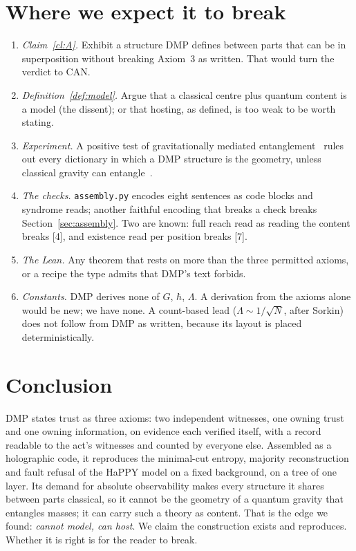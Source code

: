 \documentclass[11pt,a4paper]{article}
\theoremstyle{definition}
\theoremstyle{remark}
\newcommand{\chk}[1]{\textsf{[#1]}}
\begin{document}
\section{Where we expect it to break}\label{sec:break}
\begin{enumerate}[nosep]
\item \emph{Claim~\ref{cl:A}.} Exhibit a structure DMP defines between parts that can be in superposition without breaking Axiom~3 as
written. That would turn the verdict to CAN.
\item \emph{Definition~\ref{def:model}.} Argue that a classical centre plus quantum content is a model (the dissent); or that hosting, as
defined, is too weak to be worth stating.
\item \emph{Experiment.} A positive test of gravitationally mediated entanglement~\cite{bose,mv} rules out every dictionary in which a DMP
structure is the geometry, unless classical gravity can entangle~\cite{azizhowl}.
\item \emph{The checks.} \texttt{assembly.py} encodes eight sentences as code blocks and syndrome reads; another faithful encoding that
breaks a check breaks Section~\ref{sec:assembly}. Two are known: full reach read as reading the content breaks \chk{4}, and existence read
per position breaks \chk{7}.
\item \emph{The Lean.} Any theorem that rests on more than the three permitted axioms, or a recipe the type admits that DMP's text forbids.
\item \emph{Constants.} DMP derives none of $G$, $\hbar$, $\Lambda$. A derivation from the axioms alone would be new; we have none. A
count-based lead ($\Lambda\sim 1/\sqrt N$, after Sorkin) does not follow from DMP as written, because its layout is placed
deterministically.
\end{enumerate}

\section{Conclusion}

DMP states trust as three axioms: two independent witnesses, one owning trust and one owning information, on evidence each verified
itself, with a record readable to the act's witnesses and counted by everyone else. Assembled as a holographic code, it reproduces the
minimal-cut entropy, majority reconstruction and fault refusal of the HaPPY model on a fixed background, on a tree of one layer. Its demand for
absolute observability makes every structure it shares between parts classical, so it cannot be the geometry of a quantum gravity that
entangles masses; it can carry such a theory as content. That is the edge we found: \emph{cannot model, can host}. We claim the
construction exists and reproduces. Whether it is right is for the reader to break.
\end{document}

